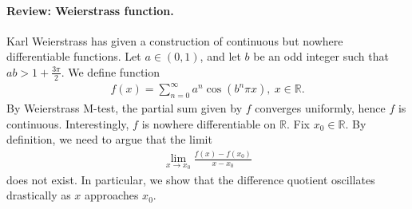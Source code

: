 \documentclass{article}
\begin{document}
\paragraph{Review: Weierstrass function.} Karl Weierstrass has given a construction of continuous but nowhere differentiable functions. Let $a\in (0,1)$, and let $b$ be an odd integer such that $ab>1+\frac{3\pi}{2}$. We define function
\begin{align*}
	f(x) = \sum_{n=0}^\infty a^n\cos\left(b^n\pi x\right),\ x\in\mathbb{R}.
\end{align*}
By Weierstrass M-test, the partial sum given by $f$ converges uniformly, hence $f$ is continuous. Interestingly, $f$ is nowhere differentiable on $\mathbb{R}$. Fix $x_0\in\mathbb{R}$. By definition, we need to argue that the limit
\begin{align*}
	\lim_{x\to x_0} \frac{f(x)-f(x_0)}{x-x_0}
\end{align*}
does not exist. In particular, we show that the difference quotient oscillates drastically as $x$ approaches $x_0$.
\end{document}
